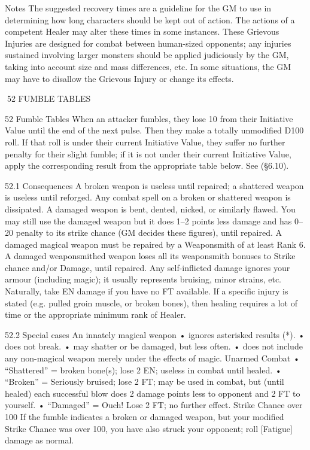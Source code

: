 \documentclass[a4paper]{article}
\begin{document}
\begin{multicols}{3}
Notes
The suggested recovery times are a guideline for
the GM to use in determining how long characters
should be kept out of action. The actions of a competent Healer may alter these times in some instances.
These Grievous Injuries are designed for combat
between human-sized opponents; any injuries
sustained involving larger monsters should be
applied judiciously by the GM, taking into account
size and mass differences, etc. In some situations,
the GM may have to disallow the Grievous Injury
or change its effects.

52 FUMBLE TABLES

52 Fumble Tables
When an attacker fumbles, they lose 10 from their
Initiative Value until the end of the next pulse.
Then they make a totally unmodified D100 roll. If
that roll is under their current Initiative Value, they
suffer no further penalty for their slight fumble; if
it is not under their current Initiative Value, apply
the corresponding result from the appropriate table
below. See (§6.10).

52.1 Consequences
A broken weapon is useless until repaired; a shattered weapon is useless until reforged. Any combat
spell on a broken or shattered weapon is dissipated.
A damaged weapon is bent, dented, nicked, or
similarly flawed. You may still use the damaged
weapon but it does 1–2 points less damage and has
0–20 penalty to its strike chance (GM decides these
figures), until repaired.
A damaged magical weapon must be repaired by a
Weaponsmith of at least Rank 6. A damaged
weaponsmithed weapon loses all its weaponsmith
bonuses to Strike chance and/or Damage, until
repaired.
Any self-inflicted damage ignores your armour
(including magic); it usually represents bruising,
minor strains, etc. Naturally, take EN damage if
you have no FT available. If a specific injury is
stated (e.g. pulled groin muscle, or broken bones),
then healing requires a lot of time or the appropriate minimum rank of Healer.

52.2 Special cases
An innately magical weapon
• ignores asterisked results (*).
• does not break.
• may shatter or be damaged, but less often.
• does not include any non-magical weapon merely
under the effects of magic.
Unarmed Combat
• “Shattered” = broken bone(s); lose 2 EN; useless
in combat until healed.
• “Broken” = Seriously bruised; lose 2 FT; may be
used in combat, but (until healed) each successful
blow does 2 damage points less to opponent and 2
FT to yourself.
• “Damaged” = Ouch! Lose 2 FT; no further effect.
Strike Chance over 100
If the fumble indicates a broken or damaged
weapon, but your modified Strike Chance was over
100, you have also struck your opponent; roll [Fatigue] damage as normal.


\end{multicols}
\end{document}
